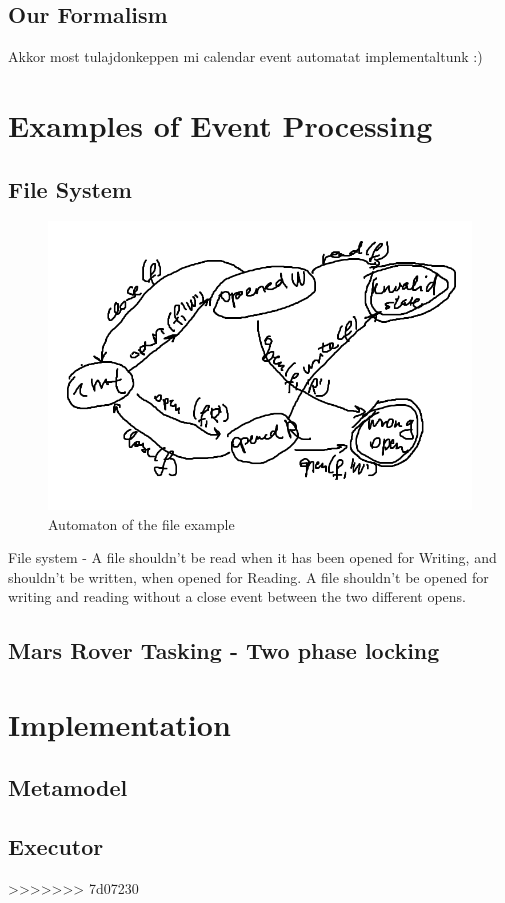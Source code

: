 	\subsection{Our Formalism}
		Akkor most tulajdonkeppen mi calendar event automatat implementaltunk :) 
\section{Examples of Event Processing}

	\subsection{File System}
	
	\begin{figure}[h]
	\centering
	\includegraphics[width=0.5\linewidth]{include/figures/chapter_5/fileautomaton}
	\caption{Automaton of the file example}
	\label{fig:cep:fileautomaton}
	\end{figure}

	File system - A file shouldn't be read when it has been opened for Writing, and shouldn't be written, when opened for Reading. 
	A file shouldn't be opened for writing and reading without a close event between the two different opens.
	
	
	\subsection{Mars Rover Tasking - Two phase locking}

\section{Implementation}
	\subsection{Metamodel}
	\subsection{Executor}
>>>>>>> 7d07230
